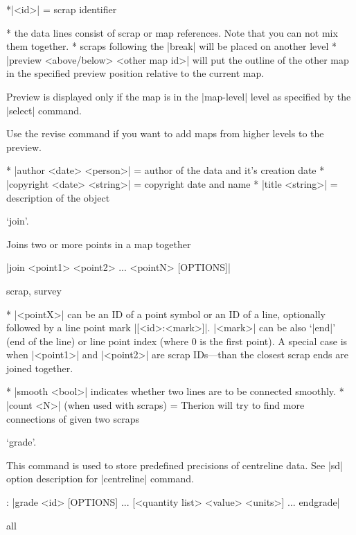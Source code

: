 \arguments
  *|<id>| = scrap identifier
\endarguments

\comopt
  * the data lines consist of scrap or map references. Note that
    you can not mix them together.
  * scraps following the |break| will be placed on another level
  * |preview <above/below> <other map id>| will put the outline of
    the other map in the specified preview position relative to the
    current map. 

    Preview is displayed only if the map is in the |map-level| level as
    specified by the |select| command.
    
    Use the revise command if you want to add maps from higher levels to the
    preview.
\endcomopt

\options
  * |author <date> <person>| = author of the data and it's creation date
  * |copyright <date> <string>| = copyright date and name
  * |title <string>| = description of the object
\endoptions


\subsubchapter `join'.

\description
  Joins two or more points in a map together
\enddescription

\syntax
  |join <point1> <point2> ... <pointN> [OPTIONS]|
\endsyntax

\context
  scrap, survey
\endcontext

\arguments
   * |<pointX>| can be an ID of a point symbol or an ID of a line,
     optionally followed by a line point mark |[<id>:<mark>]|.
     |<mark>| can be also `|end|' (end of the line) or line point index
     (where 0 is the first point). A special case is when |<point1>|
     and |<point2>| are scrap IDs---than the closest scrap ends are
     joined together.
\endarguments

\options
  * |smooth <bool>| indicates whether two lines are to be connected 
    smoothly.
  * |count <N>| (when used with scraps) = Therion will try to find more 
    connections of given two scraps  
\endoptions


\subsubchapter `grade'.

\description
   This command is used to store predefined precisions of centreline data.
   See |sd| option description for |centreline| command. 
\enddescription

\syntax:
  |grade <id> [OPTIONS]
        ...
        [<quantity list> <value> <units>]
        ...
        endgrade|
\endsyntax

\context
  all
\endcontext

\arguments
\endarguments


